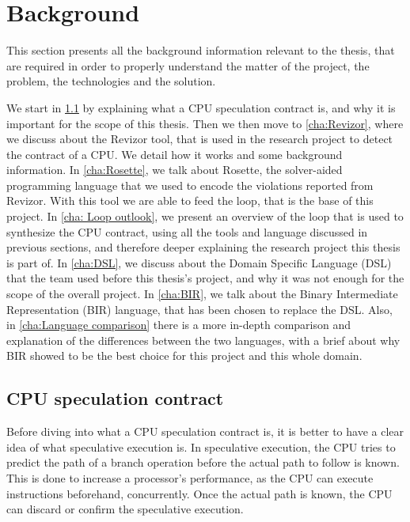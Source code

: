 \chapter{Background}
\label{cha:background}

This section presents all the background information relevant to the thesis, that
are required in order to properly understand the matter of the project, the
problem, the technologies and the solution.

We start in \cref{cha:CPU speculation contract} by explaining what a CPU speculation
contract is, and why it is important for the scope of this thesis. Then we then move
to \cref{cha:Revizor}, where we discuss about the Revizor tool, that is used in the
research project to detect the contract of a CPU. We detail how it works and
some background information. In \cref{cha:Rosette}, we talk about Rosette, the solver-aided
programming language that we used to encode the violations reported from Revizor.
With this tool we are able to feed the loop, that is the base of this project.
In \cref{cha: Loop outlook}, we present an overview of the loop that is used to synthesize
the CPU contract, using all the tools and language discussed in previous
sections, and therefore deeper explaining the research project this thesis is part
of. In \cref{cha:DSL}, we discuss about the Domain Specific Language (DSL) that the
team used before this thesis's project, and why it was not enough for the scope
of the overall project. In \cref{cha:BIR}, we talk about the Binary Intermediate
Representation (BIR) language, that has been chosen to replace the DSL. Also, in
\cref{cha:Language comparison} there is a more in-depth comparison and explanation
of the differences between the two languages, with a brief about why BIR showed
to be the best choice for this project and this whole domain.

\section{CPU speculation contract}
\label{cha:CPU speculation contract} Before diving into what a CPU speculation
contract is, it is better to have a clear idea of what speculative execution is.
In speculative execution, the CPU tries to predict the path of a branch operation
before the actual path to follow is known. This is done to increase a processor's
performance, as the CPU can execute instructions beforehand, concurrently. Once the
actual path is known, the CPU can discard or confirm the speculative execution.

